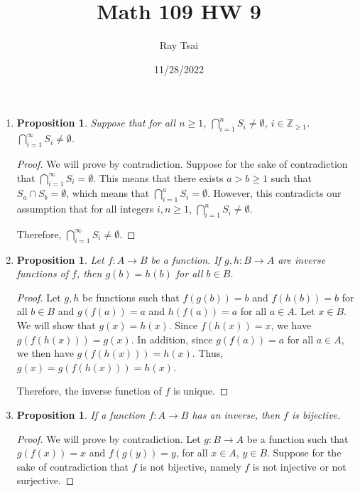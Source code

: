 \documentclass{article}
\title{Math 109 HW 9}
\author{Ray Tsai}
\date{11/28/2022}
\newtheorem{prop}[thm]{Proposition}
\begin{document}
 

\maketitle 

\begin{enumerate}
\item 
\begin{prop}
    Suppose that for all $n \geq 1$, $\bigcap\limits_{i=1}^n S_i \neq \emptyset$, $i \in \mathbb{Z}_{\geq 1}$. $\bigcap\limits_{i=1}^\infty S_i \neq \emptyset$.
\end{prop}
\begin{proof}
    We will prove by contradiction. Suppose for the sake of contradiction that $\bigcap\limits_{i=1}^\infty S_i = \emptyset$. This means that there exists $a > b \geq 1$ such that $S_a \cap S_b = \emptyset$, which means that $\bigcap\limits_{i=1}^a S_i = \emptyset$. However, this contradicts our assumption that for all integers $i, n \geq 1$, $\bigcap\limits_{i=1}^n S_i \neq \emptyset$.

    Therefore, $\bigcap\limits_{i=1}^\infty S_i \neq \emptyset$.
\end{proof}

\item 
\begin{prop}
    Let $f: A \rightarrow B$ be a function. If $g,h: B \rightarrow A$ are inverse functions of $f$, then $g(b) = h(b)$ for all $b \in B$.
\end{prop}
\begin{proof}
    Let $g, h$ be functions such that $f(g(b)) = b$ and $f(h(b)) = b$ for all $b \in B$ and $g(f(a)) = a$ and $h(f(a)) = a$ for all $a \in A$. Let $x \in B$. We will show that $g(x) = h(x)$. 
    Since $f(h(x)) = x$, we have $g(f(h(x))) = g(x)$. In addition, since $g(f(a)) = a$ for all $a \in A$, we then have $g(f(h(x))) = h(x)$. Thus, $g(x) = g(f(h(x))) = h(x)$.

    Therefore, the inverse function of $f$ is unique.
\end{proof}

\item \begin{prop}
    If a function $f: A \rightarrow B$ has an inverse, then $f$ is bijective.
\end{prop}
\begin{proof}
    We will prove by contradiction. Let $g: B \rightarrow A$ be a function such that $g(f(x)) = x$ and $f(g(y)) = y$, for all $x \in A$, $y \in B$. Suppose for the sake of contradiction that $f$ is not bijective, namely $f$ is not injective or not surjective. 


\end{proof}
\end{enumerate}
\end{document}
